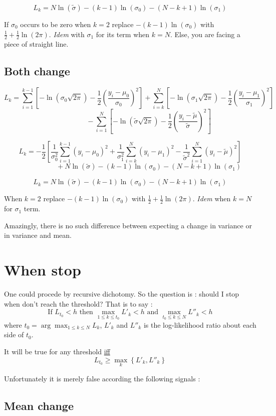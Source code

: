 \documentclass[11pt]{article}
\begin{document}
\[L_k=N\ln(\tilde\sigma)-(k-1)\ln(\sigma_0)-(N-k+1)\ln(\sigma_1)\]


If $\sigma_0$ occurs to be zero when $k=2$ replace $-(k-1)\ln(\sigma_0)$ with $\frac12+\frac12\ln(2\pi)$.
\emph{Idem} with $\sigma_1$ for its term when $k=N$.
Else, you are facing a piece of straight line.

\subsection{Both change}

\[L_k=
\sum_{i=1}^{k-1}\left[-\ln(\sigma_0\sqrt{2\pi})-\frac 12\left(\frac{y_i-\mu_0}{\sigma_0}\right)^2\right]
+\sum_{i=k}^N\left[-\ln(\sigma_1\sqrt{2\pi})-\frac 12\left(\frac{y_i-\mu_1}{\sigma_1}\right)^2\right]\]
\[~~~~~~~~~~~~~~~~~~~~~~~~-\sum_{i=1}^N\left[-\ln(\tilde\sigma\sqrt{2\pi})-\frac 12\left(\frac{y_i-\tilde\mu}{\tilde\sigma}\right)^2\right]\]

\[L_k=
-\frac 12\left[\frac 1{\sigma_0^2}\sum_{i=1}^{k-1}(y_i-\mu_0)^2
+\frac 1{\sigma_1^2}\sum_{i=k}^N(y_i-\mu_1)^2
-\frac 1{\tilde\sigma^2}\sum_{i=1}^N(y_i-\tilde\mu)^2\right]\]
\[~~~~~~~~~~~~~~~~~~~~~~~~+N\ln(\tilde\sigma)-(k-1)\ln(\sigma_0)-(N-k+1)\ln(\sigma_1)\]

\[L_k=N\ln(\tilde\sigma)-(k-1)\ln(\sigma_0)-(N-k+1)\ln(\sigma_1)\]

When $k=2$ replace $-(k-1)\ln(\sigma_0)$ with $\frac12+\frac12\ln(2\pi)$.
\emph{Idem} when $k=N$ for $\sigma_1$ term.

Amazingly, there is no such difference between expecting a change in variance or in variance and mean.

\section{When stop}

One could procede by recursive dichotomy. So the question is : should I stop when don't reach the threshold? That is to say :
\[\text{If }L_{t_0}< h\text{ then }\max_{1\le k\le t_0}L'_k< h\text{ and }\max_{t_0\le k\le N}L''_k< h\]
where $t_0=\arg\max_{1\le k\le N}L_k$, $L'_k$ and $L''_k$ is the log-likelihood ratio about each side of $t_0$.

It will be true for any threshold \underline{iff}
\[L_{t_0}\ge\max_k\left\{L'_k,L''_k\right\}\]

Unfortunately it is merely false according the following signals :

\subsection{Mean change}
\end{document}
